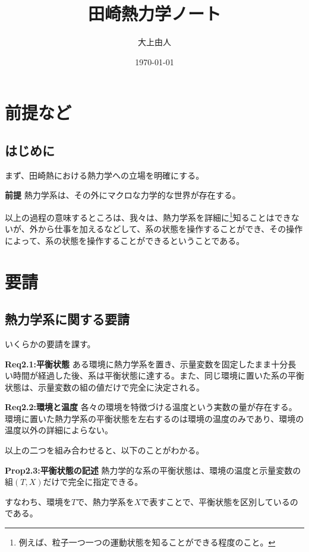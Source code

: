 \documentclass[a4paper,11pt]{jsarticle}
\begin{document}
\title{田崎熱力学ノート}
\author{大上由人}
\date{\today}
\maketitle

\tableofcontents

\newpage

\section{前提など}
\subsection{はじめに}
まず、田崎熱における熱力学への立場を明確にする。\\
\begin{itembox}[l]{\textbf{前提}}
    熱力学系は、その外にマクロな力学的な世界が存在する。

\end{itembox}
以上の過程の意味するところは、我々は、熱力学系を詳細に\footnote[1]{例えば、粒子一つ一つの運動状態を知ることができる程度のこと。}知ることはできないが、外から仕事を加えるなどして、系の状態を操作することができ、その操作によって、系の状態を操作することができるということである。\\

\section{要請}
\subsection{熱力学系に関する要請}
いくらかの要請を課す。\\
\begin{itembox}[l]{\textbf{Req2.1:平衡状態}}
    ある環境に熱力学系を置き、示量変数を固定したまま十分長い時間が経過した後、系は平衡状態に達する。また、同じ環境に置いた系の平衡状態は、示量変数の組の値だけで完全に決定される。
\end{itembox}
\begin{itembox}[l]{\textbf{Req2.2:環境と温度}}
    各々の環境を特徴づける温度という実数の量が存在する。環境に置いた熱力学系の平衡状態を左右するのは環境の温度のみであり、環境の温度以外の詳細によらない。
\end{itembox}
以上の二つを組み合わせると、以下のことがわかる。\\
\begin{itembox}[l]{\textbf{Prop2.3:平衡状態の記述}}
    熱力学的な系の平衡状態は、環境の温度と示量変数の組$(T,X)$だけで完全に指定できる。
\end{itembox}
すなわち、環境を$T$で、熱力学系を$X$で表すことで、平衡状態を区別しているのである。\\
\end{document}
